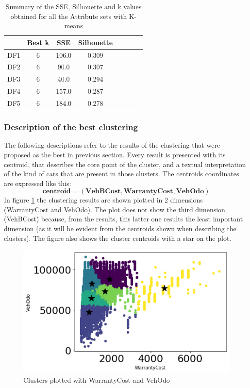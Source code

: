 \documentclass{article}
\begin{document}
	\begin{table}[H]
		\centering
		\begin{tabular}{c|ccccccc}
			\hline
			&  Best k & SSE& Silhouette \\
			\hline
			\rowcolor{Gray}
			DF1 & 6 & 106.0 & 0.309 \\
			DF2 & 6 & 90.0 & 0.307  \\
			\rowcolor{Gray}
			DF3 & 6 & 40.0 & 0.294 \\
			DF4 & 6 & 157.0 & 0.287  \\
			\rowcolor{Gray}
			DF5 & 6 & 184.0\textbf & 0.278 \\
			\hline
		\end{tabular}
		\caption{{ Summary of the SSE, Silhouette and k values obtained for all the Attribute sets with K-means}}
		\label{tab:SSESilu}
	\end{table}
	
	
	\subsubsection{Description of the best clustering}
	\label{sec:clusterdescr}
	The following descriptions refer to the results of the clustering that were proposed as the best in previous section. Every result is presented with its centroid, that describes the core point of the cluster, and a textual interpretation of the kind of cars that are present in those clusters. 
	The centroids coordinates are expressed like this:  
	$$ \mathbf{centroid} = (\mathbf{VehBCost}, \mathbf{WarrantyCost}, \mathbf{VehOdo}) $$
	In figure \ref{fig:centroid} the clustering results are shown plotted in 2 dimensions (WarrantyCost and VehOdo). The plot does not show the third dimension (VehBCost) because, from the results, this latter one results the least important dimension (as it will be evident from the centroids shown when describing the clusters).
	The figure also shows the cluster centroids with a star on the plot. 
	
	\begin{figure}[H]
		\centering
		\includegraphics[width=.4\textwidth, keepaspectratio]{centroid}
		\caption{{Clusters plotted with WarrantyCost and VehOdo}}
		\label{fig:centroid}
	\end{figure}
	
\end{document}
